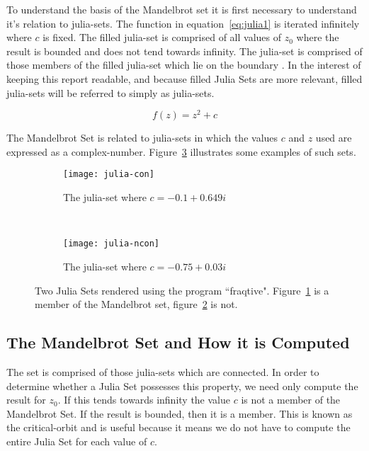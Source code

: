 To understand the basis of the Mandelbrot set it is first necessary to understand it's relation to julia-sets.
The function in equation~\ref{eq:julia1} is iterated infinitely where \(c\) is fixed.
The filled julia-set is comprised of all values of \(z_0\) where the result is bounded and does not tend towards infinity.
The julia-set is comprised of those members of the filled julia-set which lie on the boundary \cite{chaosfract}.
In the interest of keeping this report readable, and because filled Julia Sets are more relevant, filled julia-sets will be 
referred to simply as julia-sets.

\begin{equation}\label{eq:julia1}
f(z) = z^2 + c
\end{equation}

The Mandelbrot Set is related to julia-sets in which the values \(c\) and \(z\) used are expressed as a 
complex-number. Figure~\ref{fig:juliaimgs} illustrates some examples of such sets. 

\begin{figure}[h]
\centering
\begin{subfigure}[b]{0.48\textwidth}
  \centering    
  \texttt{[image: julia-con]}
  \caption{
    \tiny The julia-set where \(c = -0.1 + 0.649i\)
  }
  \label{fig:juliaimgcon}
\end{subfigure}
~ %
\begin{subfigure}[b]{0.48\textwidth}
  \centering
  \texttt{[image: julia-ncon]}
  \caption{
    \tiny The julia-set where \(c = -0.75 + 0.03i\)
  }
  \label{fig:juliaimgncon}
\end{subfigure}
\caption{
  Two Julia Sets rendered using the program ``fraqtive"\cite{fraqtive}. 
  Figure~\ref{fig:juliaimgcon} is a member of the Mandelbrot set, 
  figure~\ref{fig:juliaimgncon} is not.
}
\label{fig:juliaimgs}
\end{figure}

\subsection*{The Mandelbrot Set and How it is Computed}

The set is comprised of those julia-sets which are connected. In order to determine whether a Julia Set possesses this property,
we need only compute the result for \(z_0\). If this tends towards infinity the value \(c\) is not a member of the Mandelbrot Set. If the result
is bounded, then it is a member. This is known as the \gls{critical-orbit} and is useful because it means we do not have to compute
the entire Julia Set for each value of \(c\).

